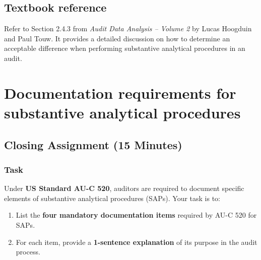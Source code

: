 \documentclass[11pt,a4paper,openany]{memoir}
\begin{document}
\section*{Textbook reference}

Refer to Section 2.4.3 from \textit{Audit Data Analysis -- Volume 2} by Lucas Hoogduin and Paul Touw. It provides a detailed discussion on how to determine an acceptable difference when performing substantive analytical procedures in an audit.

\chapter{Documentation requirements for substantive analytical procedures}

\section*{Closing Assignment (15 Minutes)}

\subsection*{Task}
Under \textbf{US Standard AU-C 520}, auditors are required to document specific elements of substantive analytical procedures (SAPs). Your task is to:

\begin{enumerate}
    \item List the \textbf{four mandatory documentation items} required by AU-C 520 for SAPs.
    \item For each item, provide a \textbf{1-sentence explanation} of its purpose in the audit process.
\end{enumerate}


\end{document}
